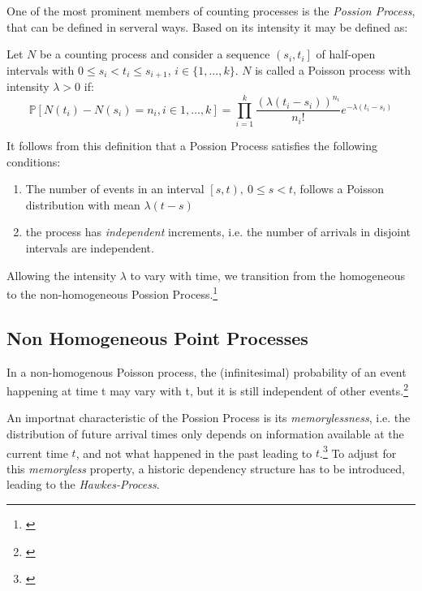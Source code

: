 \documentclass[12pt,a4paper]{cau_thesis}
\begin{document}
One of the most prominent members of counting processes is the \emph{Possion Process},
that can be defined in serveral ways.
Based on its intensity it may be defined as:
\begin{definition}\label{def:possion_process}
    Let $N$ be a counting process and consider a sequence $\left(s_{i},{} t_{i}\right]$
    of half-open intervals with $0 \leq s_{i} < t_{i} \leq s_{i+1}$, $i \in \{1, \ldots, k\}$.
    $N$ is called a Poisson process with intensity $\lambda > 0$ if:
    \begin{equation}
        \mathbb{P}[N(t_{i}) - N(s_{i}) = n_{i}, i \in {1, \ldots, k}] = \prod_{i=1}^{k} \frac{(\lambda(t_{i}-s_{i}))^{n_{i}}}{n_{i}!} e^{-\lambda(t_{i}-s_{i})}
    \end{equation}

    It follows from this definition that a Possion Process satisfies the
    following conditions:
    \begin{enumerate}
        \item The number of events in an interval $\left[s, t\right),~0 \leq s <
                  t$, follows a Poisson distribution with mean $\lambda (t-s)$
        \item the process has \emph{independent} increments, i.e. the number of
              arrivals in disjoint intervals are independent.
    \end{enumerate}
\end{definition}
Allowing the intensity $\lambda$ to vary with time, we transition from
the homogeneous to the non-homogeneous Possion Process.\footnote{\cite[See ][, p.4]{oxford_hawkes_2020}}
\subsection{Non Homogeneous Point Processes}\label{sub_sec:non_homogeneous_point_processes}
In a non-homogenous Poisson process, the (infinitesimal) probability
of an event happening at time t may vary with t, but it is still
independent of other events.\footnote{\cite[See ][,
        p.1]{mei2017neural}}

An importnat characteristic of the Possion Process is its
\emph{memorylessness}, i.e. the distribution of future arrival times
only depends on information available at the current time $t$, and
not what happened in the past leading to $t$.\footnote{\cite[See ][,
        p.4]{oxford_hawkes_2020}} To adjust for this \emph{memoryless}
property, a historic dependency structure has to be introduced,
leading to the \emph{Hawkes-Process}.
\end{document}
